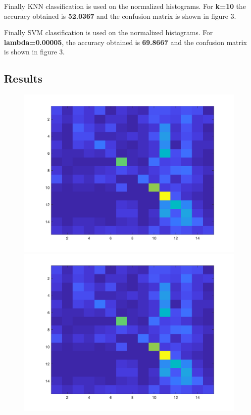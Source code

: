 \documentclass[letter, 11pt]{article}
\begin{document}
Finally KNN classification is used on the normalized histograms. For \textbf{k=10} the accuracy obtained is \textbf{52.0367} and the confusion matrix is shown in figure 3.

Finally SVM classification is used on the normalized histograms. For \textbf{lambda=0.00005}, the accuracy obtained is \textbf{69.8667} and the confusion matrix is shown in figure 3.

\subsection*{Results}

\begin{figure}[h]
        \centering
        \includegraphics[width=\textwidth]{HW3/RESULT/ClassifyKNN_Tiny_confusion.png}
    \endminipage\hfill
        \centering
        \includegraphics[width=\textwidth]{HW3/RESULT/ClassifyKNN_Tiny_confusion.png}

\end{figure}
\end{document}
